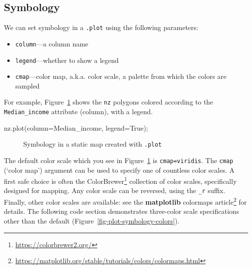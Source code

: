 \documentclass[
  letterpaper,
]{krantz}
\newenvironment{Shaded}{\begin{snugshade}}{\end{snugshade}}
\newcommand{\NormalTok}[1]{\textcolor[rgb]{0.00,0.23,0.31}{#1}}
\newcommand{\OperatorTok}[1]{\textcolor[rgb]{0.37,0.37,0.37}{#1}}
\newcommand{\StringTok}[1]{\textcolor[rgb]{0.13,0.47,0.30}{#1}}
\newcommand{\VariableTok}[1]{\textcolor[rgb]{0.07,0.07,0.07}{#1}}
\providecommand{\tightlist}{%
  \setlength{\itemsep}{0pt}\setlength{\parskip}{0pt}}\usepackage{longtable,booktabs,array}
\begin{document}
\subsection{Symbology}\label{sec-plot-symbology}

We can set symbology in a \texttt{.plot} using the following parameters:

\begin{itemize}
\tightlist
\item
  \texttt{column}---a column name
\item
  \texttt{legend}---whether to show a legend
\item
  \texttt{cmap}---color map, a.k.a. color scale, a palette from which
  the colors are sampled
\end{itemize}

For example, Figure~\ref{fig-plot-symbology} shows the \texttt{nz}
polygons colored according to the
\texttt{\textquotesingle{}Median\_income\textquotesingle{}} attribute
(column), with a legend.

\begin{Shaded}
\begin{Highlighting}[]
\NormalTok{nz.plot(column}\OperatorTok{=}\StringTok{\textquotesingle{}Median\_income\textquotesingle{}}\NormalTok{, legend}\OperatorTok{=}\VariableTok{True}\NormalTok{)}\OperatorTok{;}
\end{Highlighting}
\end{Shaded}

\begin{figure}[H]


\caption{\label{fig-plot-symbology}Symbology in a static map created
with \texttt{.plot}}

\end{figure}%

The default color scale which you see in Figure~\ref{fig-plot-symbology}
is \texttt{cmap=\textquotesingle{}viridis\textquotesingle{}}. The
\texttt{cmap} (`color map') argument can be used to specify one of
countless color scales. A first safe choice is often the
ColorBrewer\footnote{\url{https://colorbrewer2.org/}} collection of
color scales, specifically designed for mapping. Any color scale can be
reversed, using the \texttt{\_r} suffix. Finally, other color scales are
available: see the \textbf{matplotlib} colormaps article\footnote{\url{https://matplotlib.org/stable/tutorials/colors/colormaps.html}}
for details. The following code section demonstrates three-color scale
specifications other than the default
(Figure~\ref{fig-plot-symbology-colors}).
\end{document}
